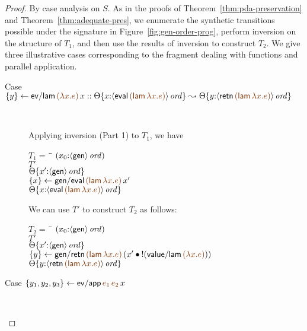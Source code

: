 \begin{proof} By case analysis on $S$. 
  As in the proofs of Theorem~\ref{thm:pda-preservation}
  and Theorem~\ref{thm:adequate-pres}, we enumerate the synthetic
  transitions possible under the signature in
  Figure~\ref{fig:gen-order-prog}, perform inversion on the structure
  of $T_1$, and then use the results of inversion to construct
  $T_2$. We give three illustrative cases corresponding to the
  fragment dealing with functions and parallel application.

\begin{description}
\item 
  [Case $\trstep{y}{{\sf ev/lam}\,\lf{(\lambda x. e)}\,x}
   ::
   \tackon{\Theta}
     {x{:}\istrue{\susp{{\sf eval}\,\lf{({\sf lam}\,\lambda x.e)}}}}
   \leadsto
   \tackon{\Theta}
     {y{:}\istrue{\susp{{\sf retn}\,\lf{({\sf lam}\,\lambda x.e)}}}}$]~

\medskip
Applying inversion (Part 1) to $T_1$, we have 

\begin{tabbing}
$T_1 = ~$ \= \qquad \= $(x_0{:}{\langle {\sf gen} \rangle}\,{{\it ord}})$
\\
\>$T'$
\\
\>\>${\Theta}\{{x'{:}{\langle {\sf gen} \rangle}\,{{\it ord}}}\}$
\\
\>$\trstep{x}{{\sf gen/eval}\,\lf{({\sf lam}\,\lambda x.e)}\,x'}$
\\
\>\>$\tackon{\Theta}
       {x{:}\istrue{\susp{{\sf eval}\,\lf{({\sf lam}\,\lambda x.e)}}}}$
\end{tabbing}

We can use $T'$ to construct $T_2$ as follows:

\begin{tabbing}
$T_2 = ~$ \= \qquad \= $(x_0{:}{\langle {\sf gen} \rangle}\,{{\it ord}})$
\\
\>$T'$
\\
\>\>${\Theta}\{{x'{:}{\langle {\sf gen} \rangle}\,{{\it ord}}}\}$
\\
\>$\trstep{y}{{\sf gen/retn}\,\lf{({\sf lam}\,\lambda x.e)}\,(\tfuser{x'}{\tbangr{({\sf value/lam}\,\lf{(\lambda x.e)})}})}$
\\
\>\>$\tackon{\Theta}
     {y{:}\istrue{\susp{{\sf retn}\,\lf{({\sf lam}\,\lambda x.e)}}}}$
\end{tabbing}

\item 
  [Case $\trstep{y_1, y_2, y_3}{{\sf ev/app}\,\lf{e_1}\,\lf{e_2}\,x}$]~


\end{description}
\end{proof}
